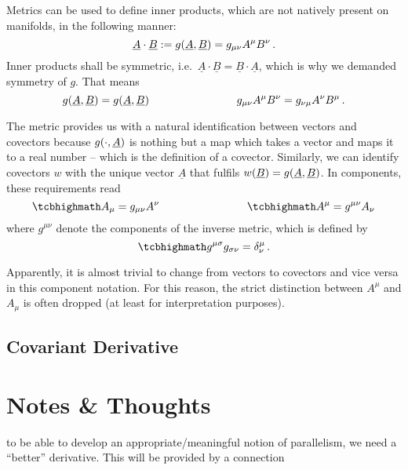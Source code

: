 \documentclass[ART_main.tex]{subfiles}
\begin{document}
Metrics can be used to define inner products, which are not natively present on manifolds, in the following manner:
\begin{equation}
\underline{A} \cdot \underline{B} := g\qty(\underline{A}, \underline{B}) = g_{\mu \nu} A^\mu B^\nu \, .
\end{equation}
Inner products shall be symmetric, i.e.~$\underline{A} \cdot \underline{B} = \underline{B} \cdot \underline{A}$, which is why we demanded symmetry of $g$. That means
\begin{equation}
g\qty(\underline{A}, \underline{B}) = g\qty(\underline{A}, \underline{B})
\qquad \qquad \qquad \qquad
g_{\mu \nu} A^\mu B^\nu = g_{\nu \mu} A^\nu B^\mu \, .
\end{equation}

The metric provides us with a natural identification between vectors and covectors because $g\qty(\cdot, \underline{A})$ is nothing but a map which takes a vector and maps it to a real number -- which is the definition of a covector. Similarly, we can identify covectors $w$ with the unique vector $\underline{A}$ that fulfils $w\qty(\underline{B}) = g\qty(\underline{A}, \underline{B})$. In components, these requirements read
\begin{equation}
\eqbox{
A_\mu = g_{\mu \nu} A^\nu
}
\manyqquad
\eqbox{
A^\mu = g^{\mu \nu} A_\nu
}
\end{equation}
where $g^{\mu \nu}$ denote the components of the inverse metric, which is defined by
\begin{equation}
\eqbox{
g^{\mu \sigma} g_{\sigma \nu} = \delta^\mu_\nu
} \, .
\end{equation}

Apparently, it is almost trivial to change from vectors to covectors and vice versa in this component notation. For this reason, the strict distinction between $A^\mu$ and $A_\mu$ is often dropped (at least for interpretation purposes).



		\subsection{Covariant Derivative}



\newpage



	\section{Notes \& Thoughts}
to be able to develop an appropriate/meaningful notion of parallelism, we need a \enquote{better} derivative. This will be provided by a connection
\end{document}

